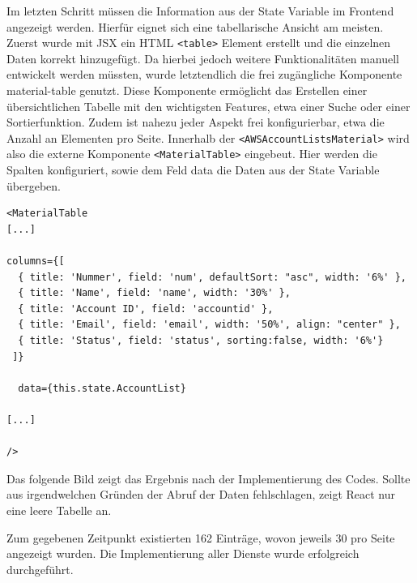\clearpage
Im letzten Schritt müssen die Information aus der State Variable im Frontend angezeigt werden.
Hierfür eignet sich eine tabellarische Ansicht am meisten.
Zuerst wurde mit JSX ein HTML \verb+<table>+ Element erstellt und die einzelnen Daten korrekt hinzugefügt.
Da hierbei jedoch weitere Funktionalitäten manuell entwickelt werden müssten, wurde letztendlich die frei zugängliche Komponente \glqq material-table\grqq{} genutzt.
Diese Komponente ermöglicht das Erstellen einer übersichtlichen Tabelle mit den wichtigsten Features, etwa einer Suche oder einer Sortierfunktion.
Zudem ist nahezu jeder Aspekt frei konfigurierbar, etwa die Anzahl an Elementen pro Seite.\cite{MaterialTable}
Innerhalb der \verb+<AWSAccountListsMaterial>+ wird also die externe Komponente \verb+<MaterialTable>+ eingebeut.
Hier werden die Spalten konfiguriert, sowie dem Feld \glqq data\grqq{} die Daten aus der State Variable übergeben.
\\
\begin{lstlisting}[basicstyle=\ttfamily\small, breaklines=true , frame = single, backgroundcolor=\color{flashwhite} ]
<MaterialTable
[...]

columns={[
  { title: 'Nummer', field: 'num', defaultSort: "asc", width: '6%' },
  { title: 'Name', field: 'name', width: '30%' },
  { title: 'Account ID', field: 'accountid' },
  { title: 'Email', field: 'email', width: '50%', align: "center" },
  { title: 'Status', field: 'status', sorting:false, width: '6%'}
 ]}

  data={this.state.AccountList}

[...]

/>
    \end{lstlisting}




 Das folgende Bild zeigt das Ergebnis nach der Implementierung des Codes.
 Sollte aus irgendwelchen Gründen der Abruf der Daten fehlschlagen, zeigt React nur eine leere Tabelle an.

 Zum gegebenen Zeitpunkt existierten 162 Einträge, wovon jeweils 30 pro Seite angezeigt wurden.
 Die Implementierung aller Dienste wurde erfolgreich durchgeführt.
\clearpage

